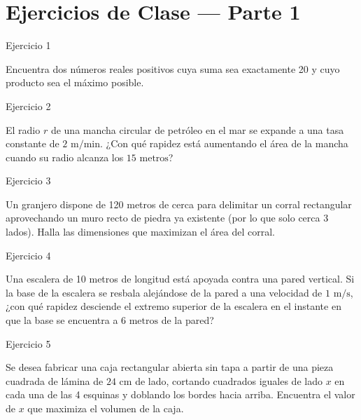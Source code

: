 \documentclass[aspectratio=169]{beamer}
\begin{document}
\section{Ejercicios de Clase — Parte 1}

\begin{frame}{Ejercicio 1}
  \begin{mwejercicio}
    Encuentra dos números reales positivos cuya suma sea exactamente 20 y cuyo producto sea el máximo posible.
  \end{mwejercicio}
  \vspace{3.5cm}
\end{frame}
\begin{frame}{Ejercicio 2}
  \begin{mwejercicio}
    El radio $r$ de una mancha circular de petróleo en el mar se expande a una tasa constante de $2\text{ m/min}$. ¿Con qué rapidez está aumentando el área de la mancha cuando su radio alcanza los $15\text{ metros}$?
  \end{mwejercicio}
  \vspace{3.5cm}
\end{frame}
\begin{frame}{Ejercicio 3}
  \begin{mwejercicio}
    Un granjero dispone de 120 metros de cerca para delimitar un corral rectangular aprovechando un muro recto de piedra ya existente (por lo que solo cerca 3 lados). Halla las dimensiones que maximizan el área del corral.
  \end{mwejercicio}
  \vspace{3.5cm}
\end{frame}
\begin{frame}{Ejercicio 4}
  \begin{mwejercicio}
    Una escalera de 10 metros de longitud está apoyada contra una pared vertical. Si la base de la escalera se resbala alejándose de la pared a una velocidad de $1\text{ m/s}$, ¿con qué rapidez desciende el extremo superior de la escalera en el instante en que la base se encuentra a $6\text{ metros}$ de la pared?
  \end{mwejercicio}
  \vspace{3.5cm}
\end{frame}
\begin{frame}{Ejercicio 5}
  \begin{mwejercicio}
    Se desea fabricar una caja rectangular abierta sin tapa a partir de una pieza cuadrada de lámina de $24\text{ cm}$ de lado, cortando cuadrados iguales de lado $x$ en cada una de las 4 esquinas y doblando los bordes hacia arriba. Encuentra el valor de $x$ que maximiza el volumen de la caja.
  \end{mwejercicio}
  \vspace{3.5cm}
\end{frame}
\end{document}
